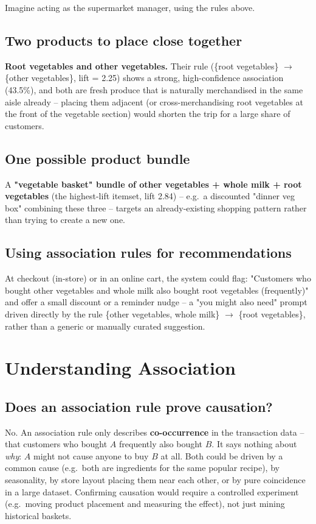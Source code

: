 \documentclass[12pt,a4paper]{article}
\begin{document}
Imagine acting as the supermarket manager, using the rules above.

\subsection{Two products to place close together}
\textbf{Root vegetables and other vegetables.} Their rule (\{root vegetables\}
$\rightarrow$ \{other vegetables\}, lift = 2.25) shows a strong, high-confidence
association (43.5\%), and both are fresh produce that is naturally merchandised in the
same aisle already -- placing them adjacent (or cross-merchandising root vegetables at the
front of the vegetable section) would shorten the trip for a large share of customers.

\subsection{One possible product bundle}
A \textbf{"vegetable basket" bundle of other vegetables + whole milk + root vegetables}
(the highest-lift itemset, lift 2.84) -- e.g.\ a discounted "dinner veg box" combining
these three -- targets an already-existing shopping pattern rather than trying to create
a new one.

\subsection{Using association rules for recommendations}
At checkout (in-store) or in an online cart, the system could flag: "Customers who bought
other vegetables and whole milk also bought root vegetables (frequently)" and offer a small
discount or a reminder nudge -- a "you might also need" prompt driven directly by the rule
\{other vegetables, whole milk\} $\rightarrow$ \{root vegetables\}, rather than a generic or
manually curated suggestion.

\clearpage
\section{Understanding Association}

\subsection{Does an association rule prove causation?}
No. An association rule only describes \textbf{co-occurrence} in the transaction data --
that customers who bought $A$ frequently also bought $B$. It says nothing about
\emph{why}: $A$ might not cause anyone to buy $B$ at all. Both could be driven by a
common cause (e.g.\ both are ingredients for the same popular recipe), by seasonality, by
store layout placing them near each other, or by pure coincidence in a large dataset.
Confirming causation would require a controlled experiment (e.g.\ moving product placement
and measuring the effect), not just mining historical baskets.
\end{document}
